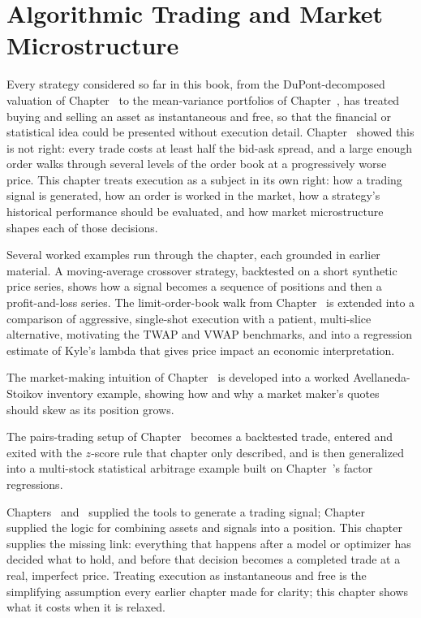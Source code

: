 \documentclass[../ai_in_finance]{subfiles}
\begin{document}
\chapter{Algorithmic Trading and Market Microstructure}

Every strategy considered so far in this book, from the DuPont-decomposed valuation of Chapter~ to the mean-variance portfolios of Chapter~, has treated buying and selling an asset as instantaneous and free, so that the financial or statistical idea could be presented without execution detail. Chapter~ showed this is not right: every trade costs at least half the bid-ask spread, and a large enough order walks through several levels of the order book at a progressively worse price. This chapter treats execution as a subject in its own right: how a trading signal is generated, how an order is worked in the market, how a strategy's historical performance should be evaluated, and how market microstructure shapes each of those decisions.

Several worked examples run through the chapter, each grounded in earlier material. A moving-average crossover strategy, backtested on a short synthetic price series, shows how a signal becomes a sequence of positions and then a profit-and-loss series. The limit-order-book walk from Chapter~ is extended into a comparison of aggressive, single-shot execution with a patient, multi-slice alternative, motivating the TWAP and VWAP benchmarks, and into a regression estimate of Kyle's lambda that gives price impact an economic interpretation.

The market-making intuition of Chapter~ is developed into a worked Avellaneda-Stoikov inventory example, showing how and why a market maker's quotes should skew as its position grows.

The pairs-trading setup of Chapter~ becomes a backtested trade, entered and exited with the $z$-score rule that chapter only described, and is then generalized into a multi-stock statistical arbitrage example built on Chapter~'s factor regressions.

Chapters~ and~ supplied the tools to generate a trading signal; Chapter~ supplied the logic for combining assets and signals into a position. This chapter supplies the missing link: everything that happens after a model or optimizer has decided what to hold, and before that decision becomes a completed trade at a real, imperfect price. Treating execution as instantaneous and free is the simplifying assumption every earlier chapter made for clarity; this chapter shows what it costs when it is relaxed.
\end{document}
